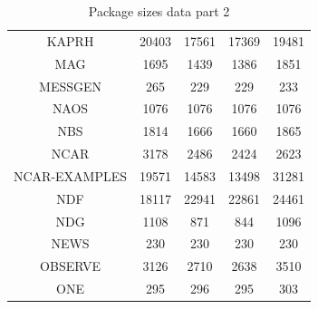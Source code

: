 \documentclass[twoside,11pt]{article}
\renewcommand{\_}{\texttt{\symbol{95}}}
\begin{document}
\begin{table}[p]
\begin{center}
\begin{tabular}{|c|c|c|c|c|}
KAPRH & 20403 & 17561 & 17369 & 19481 \\
MAG & 1695 & 1439 & 1386 & 1851 \\
MESSGEN & 265 & 229 & 229 & 233 \\
NAOS & 1076 & 1076 & 1076 & 1076 \\
NBS & 1814 & 1666 & 1660 & 1865 \\
NCAR & 3178 & 2486 & 2424 & 2623 \\
NCAR-EXAMPLES & 19571 & 14583 & 13498 & 31281 \\
NDF & 18117 & 22941 & 22861 & 24461 \\
NDG & 1108 & 871 & 844 & 1096 \\
NEWS & 230 & 230 & 230 & 230 \\
OBSERVE & 3126 & 2710 & 2638 & 3510 \\
ONE & 295 & 296 & 295 & 303 \\
\hline
\end{tabular}
\caption{Package sizes data part 2}
\end{center}
\end{table}
\end{document}
